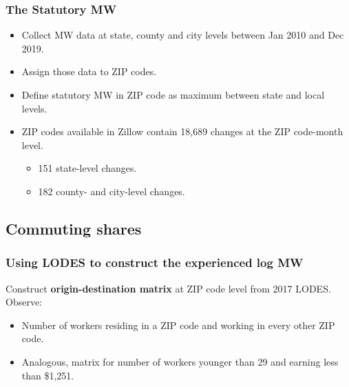 \documentclass[aspectratio=169, t]{beamer}
\begin{document}
\begin{frame}[label=stat_MW]
	\frametitle{The Statutory MW}
	
	\begin{itemize}
		\item
		Collect MW data at state, county and city levels between Jan 2010 and Dec 2019.
		
		\vspace{2mm} \item
		Assign those data to ZIP codes.
		
		\vspace{2mm} \item
		Define statutory MW in ZIP code as maximum between state and local levels.
		
		\pause
		\vspace{2mm} \item
		ZIP codes available in Zillow contain 18,689 changes at the ZIP code-month level.
		\vspace{-3.5mm} 
		\begin{itemize} \small
			\item 151 state-level changes.
			\item 182 county- and city-level changes.
		\end{itemize}
		
	\end{itemize}
	
\end{frame}

\subsection{Commuting shares}

\begin{frame}
	\frametitle{Using LODES to construct the experienced log MW}
	
	Construct \textbf{origin-destination matrix} at ZIP code level from 2017 LODES.
	Observe:
	\begin{itemize} \small
		\item Number of workers residing in a ZIP code and working in every other 
		ZIP code.
		\item Analogous, matrix for number of workers younger than 29 and earning less than 
		\$1,251.
	\end{itemize}
\end{frame}
\end{document}
